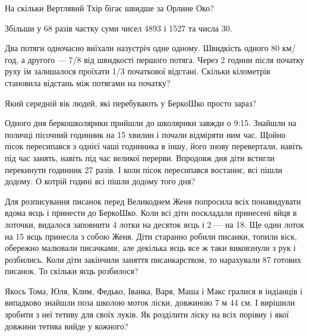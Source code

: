 На скільки Вертлявий Тхір бігає швидше за Орлине Око?


\problem
Збільши у 68 разів частку суми чисел 4893 і 1527 та числа 30.


\problem
Два потяги одночасно виїхали назустріч одне одному.
Швидкість одного 80 км/год, а другого --- 7/8 від швидкості першого потяга.
Через 2 години після початку руху їм залишалося проїхати
1/3 початкової відстані.
Скільки кілометрів становила відстань між потягами на початку?


\problem
Який середній вік людей, які перебувають у БеркоШко просто зараз?


\problem
Одного дня беркошколярики прийшли до школярики завжди о 9:15.
Знайшли на поличці пісочний годинник на 15 хвилин і почали відміряти ним час.
Щойно пісок пересипався з однієї чаші годинника в іншу,
його знову перевертали, навіть під час занять,
навіть під час великої перерви.
Впродовж дня діти встигли перекинути годинник 27 разів.
І коли пісок пересипався востаннє, всі пішли додому.
О котрій годині всі пішли додому того дня?


\problem
Для розписування писанок перед Великоднем Женя попросила всіх понавидувати
вдома яєць і принести до БеркоШко. Коли всі діти поскладали принесені яйця
в лоточки, видалося заповнити 4 лотки на десяток яєць і 2 --- на 18.
Ще один лоток на 15 яєць принесла з собою Женя.
Діти старанно робили писанки, топили віск, обережно малювали писачками,
але декілька яєць все ж таки виковзнули з рук і розбились.
Коли діти закінчили заняття писанкарством, то нарахували 87 готових писанок.
То скільки яєць розбилося?


\problem
Якось Тома, Юля, Клим, Федько, Іванка, Варя, Маша і Макс гралися
в індіанців і випадково знайшли поза школою моток ліски, довжиною 7 м 44 см.
І вирішили зробити з неї тетиву для своїх луків.
Як розділити ліску на всіх порівну і якої довжини тетива вийде у кожного?
